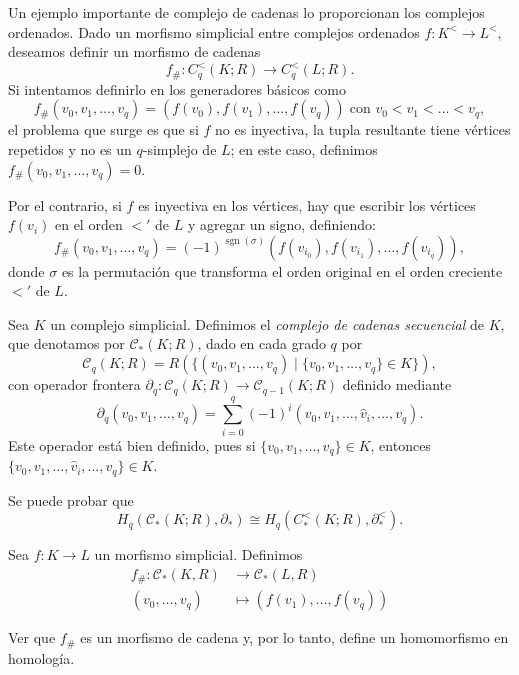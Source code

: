 \begin{ejemplo}
Un ejemplo importante de complejo de cadenas lo proporcionan los complejos ordenados. Dado un morfismo simplicial entre complejos ordenados $f \colon K^< \to L^<$, deseamos definir un morfismo de cadenas
\[
f_\# \colon C_q^<(K; R) \longrightarrow C_q^<(L; R).
\]
Si intentamos definirlo en los generadores básicos como
\[
f_\#(v_0, v_1, \dots, v_q) = (f(v_0), f(v_1), \dots, f(v_q)) \; \text{con } v_0 < v_1 < \dots < v_q,
\]
el problema que surge es que si $f$ no es inyectiva, la tupla resultante tiene vértices repetidos y no es un $q$-simplejo de $L$; en este caso, definimos $f_\#(v_0, v_1, \dots, v_q) = 0$. 

Por el contrario, si $f$ es inyectiva en los vértices, hay que escribir los vértices $f(v_i)$ en el orden $<'$ de $L$ y agregar un signo, definiendo:
\[
f_\#(v_0, v_1, \dots, v_q) = (-1)^{\operatorname{sgn}(\sigma)} (f(v_{i_0}), f(v_{i_1}), \dots, f(v_{i_q})),
\]
donde $\sigma$ es la permutación que transforma el orden original en el orden creciente $<'$ de $L$.
\end{ejemplo}
\begin{definicion}
Sea $K$ un complejo simplicial. Definimos el \textit{complejo de cadenas secuencial} de $K$, que denotamos por $\mathcal{C}_*(K; R)$, dado en cada grado $q$ por
\[
\mathcal{C}_q(K; R) = R(\{ (v_0, v_1, \dots, v_q) \mid \{v_0, v_1, \dots, v_q\} \in K \}),
\]
con operador frontera $\partial_q \colon \mathcal{C}_q(K; R) \to \mathcal{C}_{q-1}(K; R)$ definido mediante
\[
\partial_q(v_0, v_1, \dots, v_q) = \sum_{i=0}^q (-1)^i (v_0, v_1, \dots, \hat{v}_i, \dots, v_q).
\]
Este operador está bien definido, pues si $\{v_0, v_1, \dots, v_q\} \in K$, entonces $\{v_0, v_1, \dots, \hat{v}_i, \dots, v_q\} \in K$.
\end{definicion}

\begin{nota}
Se puede probar que
\[
H_q(\mathcal{C}_*(K; R), \partial_*) \cong H_q(C_*^<(K; R), \partial_*^<).
\]
\end{nota}
\begin{definicion}
    Sea $f:K\to L$ un morfismo simplicial. Definimos 
    \begin{align*}
        f_{\#}:\mathscr{C}_*(K,R)&\to\mathscr{C}_*(L,R)\\
        (v_0,\ldots,v_q)&\mapsto (f(v_1),\ldots,f(v_q))
    \end{align*}
\end{definicion}
\begin{ejercicio}
    Ver que $f_\#$ es un morfismo de cadena y, por lo tanto, define un homomorfismo en homología.
\end{ejercicio}

